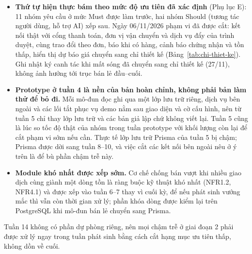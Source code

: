 \begin{itemize}
    \item \textbf{Thứ tự hiện thực bám theo mức độ ưu tiên đã xác định} (Phụ lục E): 11 nhóm yêu cầu ở mức Must được làm trước, hai nhóm Should (tương tác người dùng, hỗ trợ AI) xếp sau. Ngày 06/11/2026 phạm vi đã được cắt: kết nối thật với cổng thanh toán, đơn vị vận chuyển và dịch vụ đẩy của trình duyệt, cùng trao đổi theo đơn, báo khi có hàng, cảnh báo chứng nhận và tồn thấp, hiển thị dự báo giá chuyển sang chỉ thiết kế (Bảng~\ref{tab:chi-thiet-ke}). Ghi nhật ký canh tác khi mất sóng đã chuyển sang chỉ thiết kế (27/11), không ảnh hưởng tới trục bán lẻ đầu--cuối.
    \item \textbf{Prototype ở tuần 4 là nền của bản hoàn chỉnh, không phải bản làm thử để bỏ đi.} Mỗi mô-đun đọc ghi qua một lớp lưu trữ riêng, dịch vụ bên ngoài và các lối tắt phục vụ demo nằm sau giao diện và cờ cấu hình, nên từ tuần 5 chỉ thay lớp lưu trữ và các bản giả lập chứ không viết lại. Tuần 5 cũng là lúc so tốc độ thật của nhóm trong tuần prototype với khối lượng còn lại để cắt phạm vi sớm nếu cần. Thực tế lớp lưu trữ Prisma của tuần 5 bị chậm; Prisma được dời sang tuần 8--10, và việc cắt các kết nối bên ngoài nêu ở ý trên là để bù phần chậm trễ này.
    \item \textbf{Module khó nhất được xếp sớm.} Cơ chế chống bán vượt khi nhiều giao dịch cùng giành một dòng tồn là ràng buộc kỹ thuật khó nhất (NFR1.2, NFR4.1) và được xếp vào tuần 6--7 thay vì cuối kỳ, để nếu phát sinh vướng mắc thì vẫn còn thời gian xử lý; phần khóa dòng được kiểm lại trên PostgreSQL khi mô-đun bán lẻ chuyển sang Prisma.
\end{itemize}

\noindent Tuần 14 không có phần dự phòng riêng, nên mọi chậm trễ ở giai đoạn 2 phải được xử lý ngay trong tuần phát sinh bằng cách cắt hạng mục ưu tiên thấp, không dồn về cuối.
